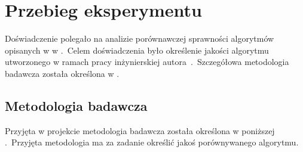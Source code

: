 \chapter{Przebieg eksperymentu}
Doświadczenie polegało na analizie porównawczej sprawności algorytmów opisanych w  w .\ Celem doświadczenia było określenie jakości algorytmu utworzonego w ramach pracy inżynierskiej autora~\cite{Blyszcz2022}.\ Szczegółowa metodologia badawcza została określona w .


\section{Metodologia badawcza}
\label{sec:met}
Przyjęta w projekcie metodologia badawcza została określona w poniższej .\ Przyjęta metodologia ma za zadanie określić jakoś porównywanego algorytmu.

